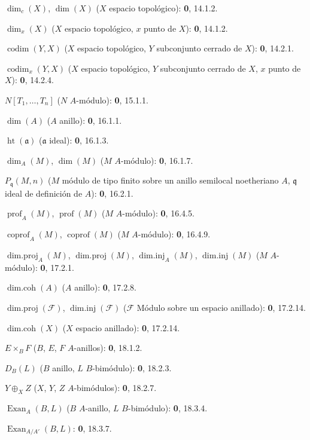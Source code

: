 $\dim_c(X)$, $\dim(X)$ ($X$ espacio topológico): \textbf{0}, 14.1.2.\par
$\dim_x(X)$ ($X$ espacio topológico, $x$ punto de $X$): \textbf{0}, 14.1.2.\par
$\operatorname{codim}(Y,X)$ ($X$ espacio topológico, $Y$ subconjunto cerrado de $X$): \textbf{0}, 14.2.1.\par
$\operatorname{codim}_x(Y,X)$ ($X$ espacio topológico, $Y$ subconjunto cerrado de $X$, $x$ punto de $X$): \textbf{0}, 14.2.4.\par
$N[T_1,\ldots,T_n]$ ($N$ $A$-módulo): \textbf{0}, 15.1.1.\par
$\dim(A)$ ($A$ anillo): \textbf{0}, 16.1.1.\par
$\operatorname{ht}(\mathfrak a)$ ($\mathfrak a$ ideal): \textbf{0}, 16.1.3.\par
$\dim_A(M)$, $\dim(M)$ ($M$ $A$-módulo): \textbf{0}, 16.1.7.\par
$P_{\mathfrak q}(M,n)$ ($M$ módulo de tipo finito sobre un anillo semilocal noetheriano $A$, $\mathfrak q$ ideal de definición de $A$): \textbf{0}, 16.2.1.\par
$\operatorname{prof}_A(M)$, $\operatorname{prof}(M)$ ($M$ $A$-módulo): \textbf{0}, 16.4.5.\par
$\operatorname{coprof}_A(M)$, $\operatorname{coprof}(M)$ ($M$ $A$-módulo): \textbf{0}, 16.4.9.\par
$\operatorname{dim.proj}_A(M)$, $\operatorname{dim.proj}(M)$,
$\operatorname{dim.inj}_A(M)$, $\operatorname{dim.inj}(M)$ ($M$ $A$-módulo): \textbf{0}, 17.2.1.\par
$\operatorname{dim.coh}(A)$ ($A$ anillo): \textbf{0}, 17.2.8.\par
$\operatorname{dim.proj}(\mathscr F)$, $\operatorname{dim.inj}(\mathscr F)$
($\mathscr F$ Módulo sobre un espacio anillado): \textbf{0}, 17.2.14.\par
$\operatorname{dim.coh}(X)$ ($X$ espacio anillado): \textbf{0}, 17.2.14.\par
$E\times_B F$ ($B$, $E$, $F$ $A$-anillos): \textbf{0}, 18.1.2.\par
$D_B(L)$ ($B$ anillo, $L$ $B$-bimódulo): \textbf{0}, 18.2.3.\par
$Y\oplus_X Z$ ($X$, $Y$, $Z$ $A$-bimódulos): \textbf{0}, 18.2.7.\par
$\operatorname{Exan}_A(B,L)$ ($B$ $A$-anillo, $L$ $B$-bimódulo): \textbf{0}, 18.3.4.\par
$\operatorname{Exan}_{A/A'}(B,L)$: \textbf{0}, 18.3.7.\par
